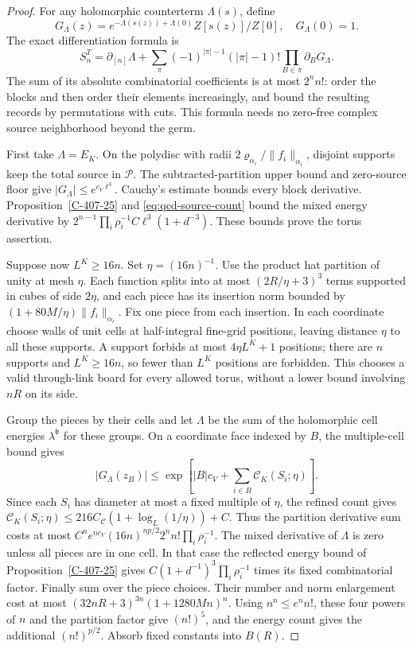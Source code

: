 \documentclass[11pt,letterpaper,reqno]{amsart}
\theoremstyle{definition}
\theoremstyle{remark}
\begin{document}
\begin{proof}
For any holomorphic counterterm $\Lambda(s)$, define
\[
 G_\Lambda(z)=e^{-\Lambda(s(z))+\Lambda(0)}Z[s(z)]/Z[0],
 \quad G_\Lambda(0)=1.
\]
The exact differentiation formula is
\[
 S_n^T=\partial_{[n]}\Lambda+
 \sum_\pi(-1)^{|\pi|-1}(|\pi|-1)!
                         \prod_{B\in\pi}\partial_BG_\Lambda.
\]
The sum of its absolute combinatorial coefficients is
at most $2^nn!$: order the blocks and then order their
elements increasingly, and bound the resulting records
by permutations with cuts. This formula needs no
zero-free complex source neighborhood beyond the germ.

First take $\Lambda=E_K$. On the polydisc with radii
$2\varrho_{\alpha_i}/\|f_i\|_{\alpha_i}$, disjoint
supports keep the total source in $\mathcal P$.
The subtracted-partition upper bound and zero-source
floor give $|G_\Lambda|\le e^{c_V\ell^3}$.
Cauchy's estimate bounds every block derivative.
Proposition~\ref{C-407-25} and
\eqref{eq:qcd-source-count} bound the mixed energy
derivative by $2^{n-1}\prod_i\rho_i^{-1}
C\ell^3(1+d^{-3})$. These bounds prove the torus assertion.

Suppose now $L^K\ge16n$. Set $\eta=(16n)^{-1}$.
Use the product hat partition of unity at mesh $\eta$.
Each function splits into at most $(2R/\eta+3)^3$
terms supported in cubes of side $2\eta$, and each
piece has its insertion norm bounded by
$(1+80M/\eta)\|f_i\|_{\alpha_i}$.
Fix one piece from each insertion. In each coordinate
choose walls of unit cells at half-integral fine-grid
positions, leaving distance $\eta$ to all these supports.
A support forbids at most $4\eta L^K+1$ positions;
there are $n$ supports and $L^K\ge16n$, so fewer than
$L^K$ positions are forbidden. This chooses a valid
through-link board for every allowed torus, without
a lower bound involving $nR$ on its side.

Group the pieces by their cells and let $\Lambda$ be
the sum of the holomorphic cell energies
$\lambda^{\mathfrak b}$ for these groups. On a
coordinate face indexed by $B$, the multiple-cell bound
gives
\[
 |G_\Lambda(z_B)|\le
 \exp\left[|B|c_V+\sum_{i\in B}
                      \mathscr C_K(S_i;\eta)\right].
\]
Since each $S_i$ has diameter at most a fixed multiple
of $\eta$, the refined count gives
$\mathscr C_K(S_i;\eta)\le
216C_{\mathscr C}(1+\log_L(1/\eta))+C$.
Thus the partition derivative sum costs at most
$C^ne^{nc_V}(16n)^{np/2}2^nn!\prod_i\rho_i^{-1}$.
The mixed derivative of $\Lambda$ is zero unless all
pieces are in one cell. In that case the reflected
energy bound of Proposition~\ref{C-407-25} gives
$C(1+d^{-1})^3\prod_i\rho_i^{-1}$ times its fixed
combinatorial factor.
Finally sum over the piece choices. Their number and
norm enlargement cost at most
$(32nR+3)^{3n}(1+1280Mn)^n$.
Using $n^n\le e^nn!$, these four powers of $n$ and
the partition factor give $(n!)^5$, and the energy
count gives the additional $(n!)^{p/2}$.
Absorb fixed constants into $B(R)$.


\end{proof}
\end{document}
